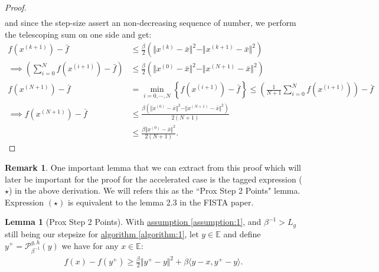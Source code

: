 \documentclass[]{article}
\theoremstyle{definition}
\newtheorem{lemma}{Lemma}[subsection]  %
\newtheorem{remark}{Remark}[subsection]
{
    \newtheorem{assumption}{Assumption}
}
\begin{document}
\begin{proof}
\begin{align*}
            \end{align*}
            and since the step-size assert an non-decreasing sequence of number, we perform the telescoping sum on one side and get: 
            \begin{align*}
                f(x^{(k + 1)}) - \bar f 
                &\le
                \frac{\beta}{2}(\Vert x^{(k)} - \bar x\Vert^2 - \Vert x^{(k + 1)} - \bar x\Vert^2)
                \\
                \implies
                \left(
                    \sum_{i = 0}^{N} f(x^{(i + 1)})
                    - \bar f
                \right)
                &\le
                \frac{\beta}{2}
                (\Vert x^{(0)} - \bar x\Vert^2 - \Vert x^{(N + 1)} - \bar x\Vert^2)
                \\
                f(x^{(N + 1)}) - \bar f & = 
                \min_{i = 0, \cdots, N}\left\lbrace
                    f(x^{(i + 1)}) - \bar f
                \right\rbrace \le 
                \left(
                    \frac{1}{N + 1}\sum_{i = 0}^{N}f(x^{(i + 1)})
                \right) - \bar f
                \\
                \implies
                f(x^{(N + 1)}) - \bar f
                &\le  
                \frac{\beta(\Vert x^{(0)} - \bar x\Vert^2 - \Vert x^{(N + 1)} - \bar x\Vert^2)}{2(N + 1)}
                \\
                &\le 
                \frac{\beta \Vert x^{(0)} - \bar x\Vert^2 }{2(N + 1)}. 
            \end{align*}
        \end{proof}
        \begin{remark}
            One important lemma that we can extract from this proof which will later be important for the proof for the accelerated case is the tagged expression ($\star$) in the above derivation. We will refers this as the ``Prox Step 2 Points" lemma. Expression $(\star)$ is equivalent to the lemma 2.3 in the FISTA paper\cite{paper:FISTA}. 
        \end{remark}
        \begin{lemma}[Prox Step 2 Points]\label{lemma:prox_two_p}
            With \hyperref[assumption:1]{assumption \ref*{assumption:1}}, and $\beta^{-1} > L_g$ still being our stepsize for \hyperref[algorithm:1]{algorithm \ref*{algorithm:1}}, let $y\in \mathbb E$ and define $y^+ = \mathcal P_{\beta^{-1}}^{g, h}(y)$ we have for any $x\in \mathbb E$: 
            \begin{align*}
                f(x) - f(y^+) \ge \frac{\beta}{2}\Vert y^+ - y\Vert^2 + 
                \beta \langle y - x, y^+ - y\rangle. 
            \end{align*}
        \end{lemma}
\end{document}
